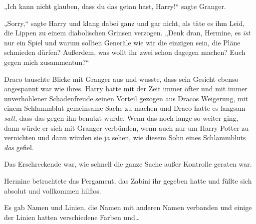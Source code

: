 „Ich kann nicht glauben, dass du das getan hast, Harry!“ sagte Granger.

„Sorry,“ sagte Harry und klang dabei ganz und gar nicht, als täte es ihm Leid, die Lippen zu einem diabolischen Grinsen verzogen. „Denk dran, Hermine, es \emph{ist} nur ein Spiel und warum sollten Generäle wie wir die einzigen sein, die Pläne schmieden dürfen? Außerdem, was wollt ihr zwei schon dagegen machen? Euch gegen mich zusammentun?“

Draco tauschte Blicke mit Granger aus und wusste, dass sein Gesicht ebenso angespannt war wie ihres. Harry hatte mit der Zeit immer öfter und mit immer unverhohlener Schadenfreude seinen Vorteil gezogen aus Dracos Weigerung, mit einem Schlammblut gemeinsame Sache zu machen und Draco hatte es langsam \emph{satt}, dass das gegen ihn benutzt wurde. Wenn das noch lange so weiter ging, dann würde er sich mit Granger verbünden, wenn auch nur um Harry Potter zu vernichten und dann würden sie ja sehen, wie diesem Sohn eines Schlammbluts \emph{das} gefiel.

\later

Das Erschreckende war, wie schnell die ganze Sache außer Kontrolle geraten war.

Hermine betrachtete das Pergament, das Zabini ihr gegeben hatte und füllte sich absolut und vollkommen hilflos.

Es gab Namen und Linien, die Namen mit anderen Namen verbanden und einige der Linien hatten verschiedene Farben und…

